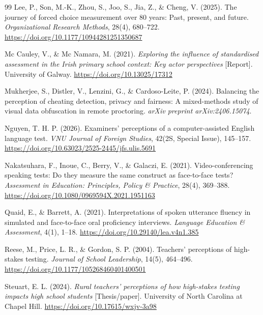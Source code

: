 \documentclass[11pt]{article}
\begin{document}
\begin{thebibliography}{99}
Lee, P., Son, M.-K., Zhou, S., Joo, S., Jia, Z., \& Cheng, V. (2025). The journey of forced choice measurement over 80 years: Past, present, and future. \textit{Organizational Research Methods}, 28(4), 680--722. \url{https://doi.org/10.1177/10944281251350687}

Mc Cauley, V., \& Mc Namara, M. (2021). \textit{Exploring the influence of standardised assessment in the Irish primary school context: Key actor perspectives} [Report]. University of Galway. \url{https://doi.org/10.13025/17312}

Mukherjee, S., Distler, V., Lenzini, G., \& Cardoso-Leite, P. (2024). Balancing the perception of cheating detection, privacy and fairness: A mixed-methods study of visual data obfuscation in remote proctoring. \textit{arXiv preprint arXiv:2406.15074}.

Nguyen, T. H. P. (2026). Examiners' perceptions of a computer-assisted English language test. \textit{VNU Journal of Foreign Studies}, 42(2S, Special Issue), 145--157. \url{https://doi.org/10.63023/2525-2445/jfs.ulis.5691}

Nakatsuhara, F., Inoue, C., Berry, V., \& Galaczi, E. (2021). Video-conferencing speaking tests: Do they measure the same construct as face-to-face tests? \textit{Assessment in Education: Principles, Policy \& Practice}, 28(4), 369--388. \url{https://doi.org/10.1080/0969594X.2021.1951163}

Quaid, E., \& Barrett, A. (2021). Interpretations of spoken utterance fluency in simulated and face-to-face oral proficiency interviews. \textit{Language Education \& Assessment}, 4(1), 1--18. \url{https://doi.org/10.29140/lea.v4n1.385}

Reese, M., Price, L. R., \& Gordon, S. P. (2004). Teachers' perceptions of high-stakes testing. \textit{Journal of School Leadership}, 14(5), 464--496. \url{https://doi.org/10.1177/105268460401400501}

Steuart, E. L. (2024). \textit{Rural teachers' perceptions of how high-stakes testing impacts high school students} [Thesis/paper]. University of North Carolina at Chapel Hill. \url{https://doi.org/10.17615/wxjv-3a98}


\end{thebibliography}
\end{document}

